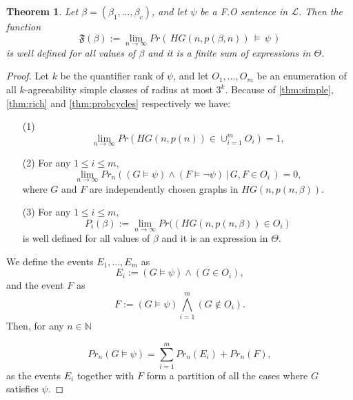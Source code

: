 \documentclass[11pt,notitlepage]{report}
\newtheorem{theorem}{Theorem}[chapter]
\theoremstyle{definition}
\newcommand{\N}{\mathbb{N}}
\newcommand{\Ln}{\lim\limits_{n\to \infty}}
\begin{document}
\begin{theorem} 
	Let $\beta=(\beta_1,\dots, \beta_c)$, and let $\psi$ be a 
	F.O sentence in $\mathcal{L}$. Then the function
	\[
	\mathfrak{F}(\beta):=\Ln Pr(\, HG(n,p(\beta,n))\, \models \, \psi \,)
	\]
	is well defined for all values of $\beta$ and it is a finite sum 
	of expressions in $\Theta$.
\end{theorem}
\begin{proof}
	Let $k$ be the quantifier rank of $\psi$, and
	let $O_1,\dots,O_m$ be an enumeration of all $k$-agreeability
	simple classes of radius at most $3^k$. Because of \cref{thm:simple},
	\cref{thm:rich} and \cref{thm:probcycles} respectively we have:
	\begin{itemize}
		\item[(1)] 
		\[ \Ln Pr(HG(n,p(n))\in \cup_{i=1}^m O_i)=1,\]
		\item[(2)] For any $1\leq i \leq m$,
		\[\Ln Pr_n((G\models \psi) \wedge
		 (F\models \neg \psi) \, | \, G,F\in O_i\,) = 0, \]
		 where $G$ and $F$ are independently chosen graphs in $HG(n,p(n,\beta))$.
		\item[(3)] For any $1\leq i \leq m$,
		\[ P_i(\beta):= \Ln Pr((HG(n,p(n,\beta)) \in O_i)\]
		is well defined for all values of $\beta$ and it is an expression
		in $\Theta$.
	\end{itemize} 
 We define the events $E_1,\dots,E_{m}$ as
\[E_i:= (G \models \psi) \wedge (G \in O_i),\]
and the  event $F$ as
\[F:= (G \models \psi) \bigwedge_{i=1}^{m} (G \notin O_i).\]
Then, for any $n\in \N$

\begin{equation} \label{eqn:sumevents}
Pr_n(G\models \psi) = \sum_{i=1}^{m} Pr_n(E_i)  + Pr_n(F),
\end{equation}
as the events $E_i$ together with $F$ form a partition of all the cases where $G$ satisfies $\psi$. \par


\end{proof}
\end{document}
